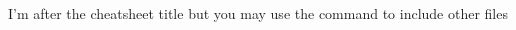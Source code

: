 \documentclass[8pt, a4paper, twoside, landscape]{extarticle}
\begin{document}
    \begin{multicols}{3}
        \raggedcolumns
        \cheatsheettitle
       I'm after the cheatsheet title but you may use the \verb!! command to include other files
        
    \end{multicols}
\end{document}
